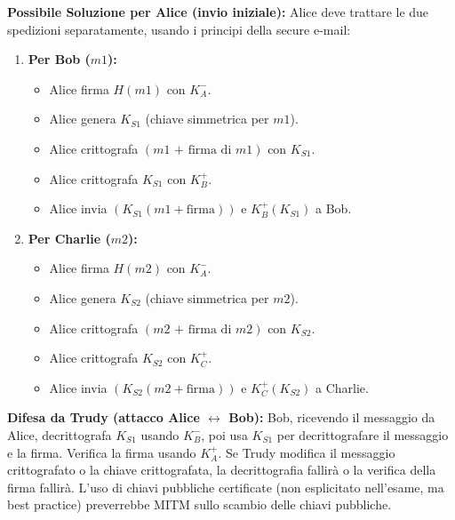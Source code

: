 \textbf{Possibile Soluzione per Alice (invio iniziale):}
Alice deve trattare le due spedizioni separatamente, usando i principi della secure e-mail:
\begin{enumerate}
    \item \textbf{Per Bob ($m1$):}
    \begin{itemize}
        \item Alice firma $H(m1)$ con $K_A^-$.
        \item Alice genera $K_{S1}$ (chiave simmetrica per $m1$).
        \item Alice crittografa $(m1 \text{ + firma di } m1)$ con $K_{S1}$.
        \item Alice crittografa $K_{S1}$ con $K_B^+$.
        \item Alice invia $(K_{S1}(m1 + \text{firma})) \text{ e } K_B^+(K_{S1})$ a Bob.
    \end{itemize}
    \item \textbf{Per Charlie ($m2$):}
    \begin{itemize}
        \item Alice firma $H(m2)$ con $K_A^-$.
        \item Alice genera $K_{S2}$ (chiave simmetrica per $m2$).
        \item Alice crittografa $(m2 \text{ + firma di } m2)$ con $K_{S2}$.
        \item Alice crittografa $K_{S2}$ con $K_C^+$.
        \item Alice invia $(K_{S2}(m2 + \text{firma})) \text{ e } K_C^+(K_{S2})$ a Charlie.
    \end{itemize}
\end{enumerate}
\textbf{Difesa da Trudy (attacco Alice $\leftrightarrow$ Bob):} Bob, ricevendo il messaggio da Alice, decrittografa $K_{S1}$ usando $K_B^-$, poi usa $K_{S1}$ per decrittografare il messaggio e la firma. Verifica la firma usando $K_A^+$. Se Trudy modifica il messaggio crittografato o la chiave crittografata, la decrittografia fallirà o la verifica della firma fallirà. L'uso di chiavi pubbliche certificate (non esplicitato nell'esame, ma best practice) preverrebbe MITM sullo scambio delle chiavi pubbliche.

